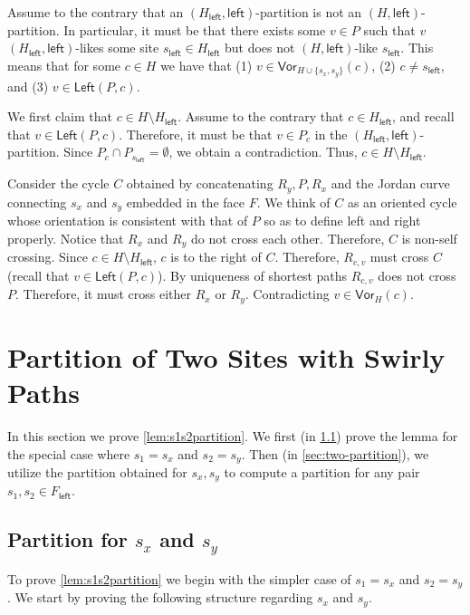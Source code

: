 \documentclass{article}
\newcommand{\Left}{\mathsf{Left}}
\newcommand{\leftside}{\mathsf{left}}
\newcommand{\Vor}{\textsf{Vor}}
\begin{document}
    Assume to the contrary that an $(H_{\leftside},\leftside)$-partition is not an $(H,\leftside)$-partition.
    In particular, it must be that there exists some $v\in P$ such that $v$ $(H_{\leftside},\leftside)$-likes some site $s_{\leftside}\in H_{\leftside}$ but does not $(H,\leftside)$-like $s_{\leftside}$.
    This means that for some $c\in H$ we have  that (1) $v\in\Vor_{H\cup\{s_x,s_y\}}(c)$,  (2) $c\ne s_{\leftside}$, and (3)  $v\in\Left(P,c)$.

    We first claim that $c\in H\setminus H_{\leftside}$.
    Assume to the contrary that $c\in H_{\leftside}$, and recall that $v\in\Left(P,c)$. Therefore, it must be that $v\in P_c$ in the $(H_{\leftside},\leftside)$-partition.
    Since $P_c\cap P_{s_{\leftside}}=\emptyset$, we obtain a contradiction.
    Thus, $c\in H\setminus H_{\leftside}$.

    Consider the cycle $C$ obtained by concatenating $R_y, P, R_x$  and the Jordan curve connecting $s_x$ and $s_y$ embedded in the face $F$.
    We think of $C$ as an oriented cycle whose orientation is consistent with that of $P$ so as to define left and right properly.
    Notice that $R_x$ and $R_y$ do not cross each other. Therefore, $C$ is non-self crossing.
    Since $c\in H\setminus H_{\leftside}$, $c$ is to the right of $C$. Therefore, $R_{c,v}$ must cross $C$ (recall that $v\in\Left(P,c)$).
    By uniqueness of shortest paths $R_{c,v}$ does not cross $P$. Therefore, it must cross either $R_x$ or $R_y$.
    Contradicting $v\in \Vor_H(c)$.




\section{Partition of Two Sites with Swirly Paths}\label{app:two_sites}
In this section we prove \cref{lem:s1s2partition}.
We first (in \cref{sec:xy-partition}) prove the lemma for the special case where $s_1=s_x$ and $s_2=s_y$.
Then (in \cref{sec:two-partition}), we utilize the partition obtained for $s_x,s_y$ to compute a partition for any pair $s_1,s_2\in F_{\leftside}$.

\subsection{Partition for $s_x$ and $s_y$}\label{sec:xy-partition}


To prove \cref{lem:s1s2partition} we begin with the simpler case of  $s_1=s_x$ and $s_2=s_y$.
We start by proving the following structure regarding $s_x$ and $s_y$.
\end{document}
